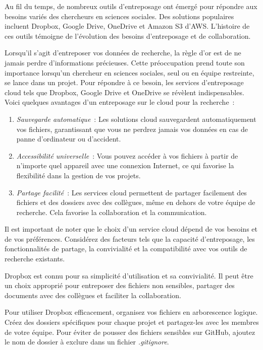 \documentclass[
  letterpaper,
]{scrbook}
\begin{document}
Au fil du temps, de nombreux outils d'entreposage ont émergé pour
répondre aux besoins variés des chercheurs en sciences sociales. Des
solutions populaires incluent Dropbox, Google Drive, OneDrive et Amazon
S3 d'AWS. L'histoire de ces outils témoigne de l'évolution des besoins
d'entreposage et de collaboration.

Lorsqu'il s'agit d'entreposer vos données de recherche, la règle d'or
est de ne jamais perdre d'informations précieuses. Cette préoccupation
prend toute son importance lorsqu'un chercheur en sciences sociales,
seul ou en équipe restreinte, se lance dans un projet. Pour répondre à
ce besoin, les services d'entreposage cloud tels que Dropbox, Google
Drive et OneDrive se révèlent indispensables. Voici quelques avantages
d'un entreposage sur le cloud pour la recherche~:

\begin{enumerate}
\def\labelenumi{\arabic{enumi}.}
\item
  \emph{Sauvegarde automatique}~: Les solutions cloud sauvegardent
  automatiquement vos fichiers, garantissant que vous ne perdrez jamais
  vos données en cas de panne d'ordinateur ou d'accident.
\item
  \emph{Accessibilité universelle}~: Vous pouvez accéder à vos fichiers
  à partir de n'importe quel appareil avec une connexion Internet, ce
  qui favorise la flexibilité dans la gestion de vos projets.
\item
  \emph{Partage facilité}~: Les services cloud permettent de partager
  facilement des fichiers et des dossiers avec des collègues, même en
  dehors de votre équipe de recherche. Cela favorise la collaboration et
  la communication.
\end{enumerate}

Il est important de noter que le choix d'un service cloud dépend de vos
besoins et de vos préférences. Considérez des facteurs tels que la
capacité d'entreposage, les fonctionnalités de partage, la convivialité
et la compatibilité avec vos outils de recherche existants.

Dropbox est connu pour sa simplicité d'utilisation et sa convivialité.
Il peut être un choix approprié pour entreposer des fichiers non
sensibles, partager des documents avec des collègues et faciliter la
collaboration.

Pour utiliser Dropbox efficacement, organisez vos fichiers en
arborescence logique. Créez des dossiers spécifiques pour chaque projet
et partagez-les avec les membres de votre équipe. Pour éviter de pousser
des fichiers sensibles sur GitHub, ajoutez le nom de dossier à exclure
dans un fichier \emph{.gitignore}.
\end{document}

